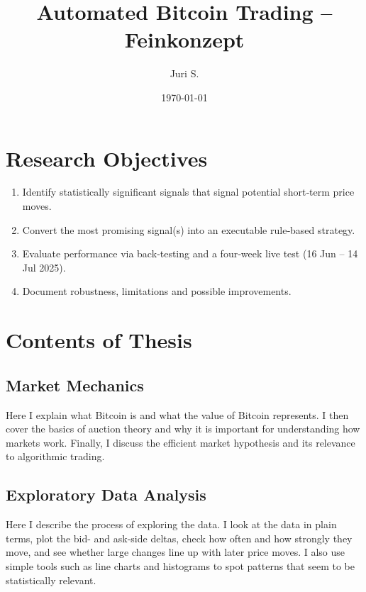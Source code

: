 \documentclass[a4paper,12pt]{article}
\title{Automated Bitcoin Trading – Feinkonzept}
\author{Juri S.}
\date{\today}
\begin{document}
\maketitle
\tableofcontents
\newpage


\section{Research Objectives}

\begin{enumerate}
  \item Identify statistically significant signals that
        signal potential short‑term price moves.
  \item Convert the most promising signal(s) into an executable
        rule‑based strategy.
  \item Evaluate performance via back‑testing and a four‑week live test
        (16 Jun – 14 Jul 2025).
  \item Document robustness, limitations and possible improvements.
\end{enumerate}


\section{Contents of Thesis}

\subsection{Market Mechanics}

Here I explain what Bitcoin is and what the value of Bitcoin represents. I then cover the basics of auction theory and why it is important for understanding how markets work. Finally, I discuss the efficient market hypothesis and its relevance to algorithmic trading.

\subsection{Exploratory Data Analysis}

Here I describe the process of exploring the data. I look at the data in plain terms, plot the bid- and ask-side deltas, check how often and how strongly they move, and see whether large changes line up with later price moves. I also use simple tools such as line charts and histograms to spot patterns that seem to be statistically relevant.
\end{document}
